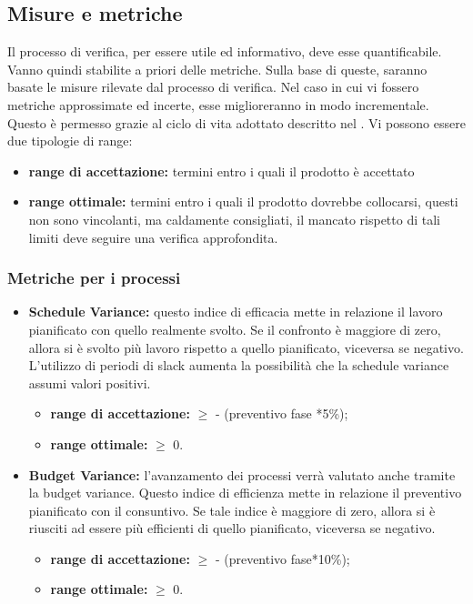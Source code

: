 	\subsection{Misure e metriche}
	Il processo di verifica, per essere utile ed informativo, deve esse quantificabile. Vanno
quindi stabilite a priori delle metriche. Sulla base di queste, saranno basate le misure
rilevate dal processo di verifica. Nel caso in cui vi fossero metriche approssimate ed incerte,
esse miglioreranno in modo incrementale. Questo è permesso grazie al ciclo di vita adottato
descritto nel \docNameVersionPdP. Vi possono essere due tipologie di range:
\begin{itemize}
	\item \textbf{range di accettazione:} termini entro i quali il prodotto è accettato
	\item \textbf{range ottimale:} termini entro i quali il prodotto dovrebbe collocarsi, questi non sono vincolanti, ma caldamente consigliati, il mancato rispetto di tali limiti deve seguire una verifica approfondita. 
\end{itemize}
	\subsubsection{Metriche per i processi}
		\begin{itemize}
		
			\item \textbf{Schedule Variance:} questo indice di efficacia mette in relazione il lavoro pianificato con quello realmente svolto. Se il confronto è maggiore di zero, allora si è svolto più lavoro rispetto a quello pianificato, viceversa se negativo. L'utilizzo di periodi di slack aumenta la possibilità che la schedule variance assumi valori positivi.
			\begin{itemize}
				\item \textbf{range di accettazione:} $\geq$ - (preventivo fase *5\%);
				\item \textbf{range ottimale:} $\geq$ 0.
			\end{itemize}
			\item \textbf{Budget Variance:} l'avanzamento dei processi verrà valutato anche tramite la budget variance. Questo indice di efficienza mette in relazione il preventivo pianificato con il consuntivo. Se tale indice è maggiore di zero, allora si è riusciti ad essere più efficienti di quello pianificato, viceversa se negativo.
			\begin{itemize}
				\item \textbf{range di accettazione:} $\geq$ - (preventivo fase*10\%);
				\item \textbf{range ottimale:} $\geq$ 0.
			\end{itemize}
		\end{itemize}

